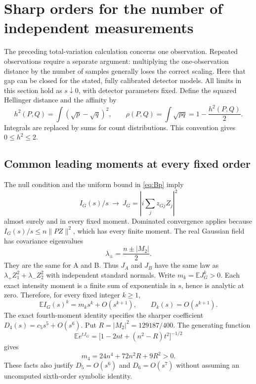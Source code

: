\section{Sharp orders for the number of independent measurements}
\label{sec:sampling}

The preceding total-variation calculation concerns one observation. Repeated
observations require a separate argument: multiplying the one-observation
distance by the number of samples generally loses the correct scaling.
Here that gap can be closed for the stated, fully calibrated detector models.
All limits in this section hold as $s\downarrow0$, with detector parameters
fixed. Define the squared Hellinger distance and the affinity by
\[
 h^2(P,Q)=\int(\sqrt p-\sqrt q)^2,\qquad
 \rho(P,Q)=\int\sqrt{pq}=1-\frac{h^2(P,Q)}2.
\]
Integrals are replaced by sums for count distributions. This convention gives
$0\le h^2\le2$.

\subsection{Common leading moments at every fixed order}

The null condition and the uniform bound in \eqref{eq:Bp} imply
\[
 I_G(s)/s\ \longrightarrow\ J_G
 =\left|i\sum_j z_{Gj}Z_j\right|^2
\]
almost surely and in every fixed moment. Dominated convergence applies because
$I_G(s)/s\le n\|PZ\|^2$, which has every finite moment. The real Gaussian
field has covariance eigenvalues
\[
 \lambda_\pm=\frac{n\pm|M_2|}{2}.
\]
They are the same for A and B. Thus $J_A$ and $J_B$ have the same law as
$\lambda_+ Z_1^2+\lambda_- Z_2^2$ with independent standard normals.
Write $m_k=\mathbb E J_G^k>0$. Each exact intensity moment is a finite sum
of exponentials in $s$, hence is analytic at zero. Therefore, for every fixed
integer $k\ge1$,
\begin{equation}\label{eq:all-leading-moments}
 \mathbb E I_G(s)^k=m_k s^k+O(s^{k+1}),\qquad
 D_k(s)=O(s^{k+1}).
\end{equation}
The exact fourth-moment identity specifies the sharper coefficient
$D_4(s)=c_5s^5+O(s^6)$. Put $R=|M_2|^2=129187/400$. The generating function
\[
 \mathbb E e^{tJ_G}=
 \bigl[1-2nt+(n^2-R)t^2\bigr]^{-1/2}
\]
gives
\begin{equation}\label{eq:m4}
 m_4=24n^4+72n^2R+9R^2>0.
\end{equation}
These facts also justify $D_5=O(s^6)$ and $D_6=O(s^7)$ without assuming
an uncomputed sixth-order symbolic identity.

